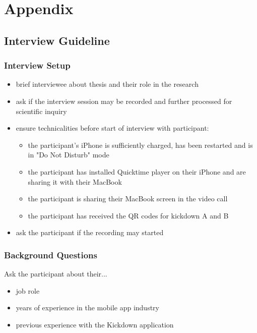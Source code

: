 \appendix
\chapter{Appendix}

\section{Interview Guideline} \label{section::interview_guideline}
\subsection{Interview Setup}
\begin{itemize}
    \item brief interviewee about thesis and their role in the research
    \item ask if the interview session may be recorded and further processed for scientific inquiry
    \item ensure technicalities before start of interview with participant:
    \begin{itemize}
        \item the participant's iPhone is sufficiently charged, has been restarted and is in "Do Not Disturb" mode
        \item the participant has installed Quicktime player on their iPhone and are sharing it with their MacBook
        \item the participant is sharing their MacBook screen in the video call
        \item the participant has received the QR codes for kickdown A and B
    \end{itemize}
    \item ask the participant if the recording may started
\end{itemize}

\subsection{Background Questions}
Ask the participant about their...
\begin{itemize}
    \item job role
    \item years of experience in the mobile app industry
    \item previous experience with the Kickdown application
\end{itemize}

